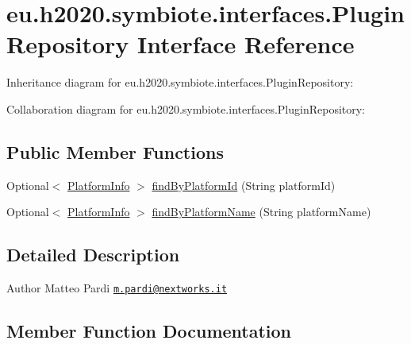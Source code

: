 \hypertarget{interfaceeu_1_1h2020_1_1symbiote_1_1interfaces_1_1PluginRepository}{}\section{eu.\+h2020.\+symbiote.\+interfaces.\+Plugin\+Repository Interface Reference}
\label{interfaceeu_1_1h2020_1_1symbiote_1_1interfaces_1_1PluginRepository}


Inheritance diagram for eu.\+h2020.\+symbiote.\+interfaces.\+Plugin\+Repository\+:


Collaboration diagram for eu.\+h2020.\+symbiote.\+interfaces.\+Plugin\+Repository\+:
\subsection*{Public Member Functions}
\begin{DoxyCompactItemize}
\item 
Optional$<$ \hyperlink{classeu_1_1h2020_1_1symbiote_1_1resources_1_1PlatformInfo}{Platform\+Info} $>$ \hyperlink{interfaceeu_1_1h2020_1_1symbiote_1_1interfaces_1_1PluginRepository_add4f1d4c4fce98a184e02df2279bdb13}{find\+By\+Platform\+Id} (String platform\+Id)
\item 
Optional$<$ \hyperlink{classeu_1_1h2020_1_1symbiote_1_1resources_1_1PlatformInfo}{Platform\+Info} $>$ \hyperlink{interfaceeu_1_1h2020_1_1symbiote_1_1interfaces_1_1PluginRepository_a298cbb233c2115c00bb7053d8ad09af5}{find\+By\+Platform\+Name} (String platform\+Name)
\end{DoxyCompactItemize}


\subsection{Detailed Description}
\begin{DoxyAuthor}{Author}
Matteo Pardi \href{mailto:m.pardi@nextworks.it}{\tt m.\+pardi@nextworks.\+it} 
\end{DoxyAuthor}


\subsection{Member Function Documentation}
\mbox{\label{interfaceeu_1_1h2020_1_1symbiote_1_1interfaces_1_1PluginRepository_add4f1d4c4fce98a184e02df2279bdb13}} 
